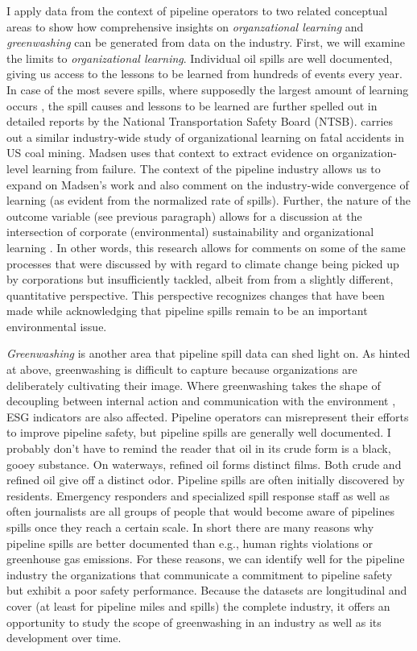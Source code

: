 \documentclass[12pt, man, natbib]{apa6}
\begin{document}
	I apply data from the context of pipeline operators to two related conceptual areas to show how comprehensive insights  on \textit{organzational learning} and \textit{greenwashing} can be generated from data on the industry. First, we will examine the limits to \textit{organizational learning}. Individual oil spills are well documented, giving us access to the lessons to be learned from hundreds of events every year. In case of the most severe spills, where supposedly the largest amount of learning occurs \citep{Madsen2010}, the spill causes and lessons to be learned are further spelled out in detailed reports by the National Transportation Safety Board (NTSB). \citet{Madsen2009} carries out a similar industry-wide study of organizational learning on fatal accidents in US coal mining. Madsen uses that context to extract evidence on organization-level learning from failure. The context of the pipeline industry allows us to expand on Madsen's work and also comment on the industry-wide convergence of learning (as evident from the normalized rate of spills). Further, the nature of the outcome variable (see previous paragraph) allows for a discussion at the intersection of corporate (environmental) sustainability and organizational learning \citep{George2015}. In other words, this research allows for comments on some of the same processes that were discussed by \citet{Nyberg2017} with regard to climate change being picked up by corporations but insufficiently tackled, albeit from from a slightly different, quantitative perspective. This perspective recognizes changes that have been made while acknowledging that pipeline spills remain to be an important environmental issue.
	
	\textit{Greenwashing} is another area that pipeline spill data can shed light on. As hinted at above, greenwashing is difficult to capture because organizations are deliberately cultivating their image. Where greenwashing takes the shape of decoupling between internal action and communication with the environment \citep{Lyon2015}, ESG indicators are also affected. Pipeline operators can misrepresent their efforts to improve pipeline safety, but pipeline spills are generally well documented. I probably don't have to remind the reader that oil in its crude form is a black, gooey substance. On waterways, refined oil forms distinct films. Both crude and refined oil give off a distinct odor. Pipeline spills are often initially discovered by residents. Emergency responders and specialized spill response staff as well as often journalists are all groups of people that would become aware of pipelines spills once they reach a certain scale. In short there are many reasons why pipeline spills are better documented than e.g., human rights violations or greenhouse gas emissions. For these reasons, we can identify well for the pipeline industry the organizations that communicate a commitment to pipeline safety but exhibit a poor safety performance. Because the datasets are longitudinal and cover (at least for pipeline miles and spills) the complete industry, it offers an opportunity to study the scope of greenwashing in an industry as well as its development over time.
	
\end{document}
